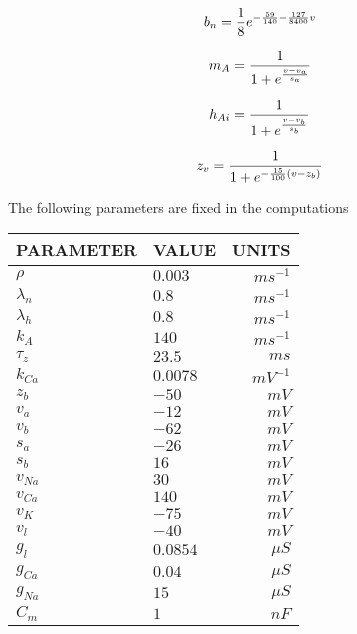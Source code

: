 \begin{equation}
b_n = \frac{1}{8} e^{-\frac{59}{140}-\frac{127}{8400}v}  \label{bn} \\
\end{equation}

\begin{equation}
m_A = \frac{1}{1+e^{\frac{v-v_a}{s_a}}}  \label{ma} \\
\end{equation}

\begin{equation}
h_{Ai} = \frac{1}{1+e^{\frac{v-v_b}{s_b}}}   \label{ha} \\
\end{equation}

\begin{equation}
z_v = \frac{1}{1+e^{-\frac{15}{100}(v - z_b)}} \label{zv} \\
\end{equation}

The following parameters are fixed in the computations

\begin{tabular}{||l|l|r||}               \hline  \hline
PARAMETER &   VALUE  &     UNITS  \\   \hline  \hline
$\rho$      &    $0.003$ &       $ms^{-1}$    \\ 
$\lambda_n$ &    $0.8$ &       $ms^{-1}$    \\
$\lambda_h$ &    $0.8$ &       $ms^{-1}$    \\
$k_{A}$     &    $140$ &       $ms^{-1}$    \\ \hline
$\tau_z$    &    $23.5$ &       $ms$    \\\hline
$k_{Ca}$     &    $0.0078$ &       $mV^{-1}$    \\  \hline
$z_b$       &    $-50$ &       $mV$   \\
$v_a$       &    $-12$ &       $mV$    \\
$v_b$       &    $-62$ &       $mV$    \\
$s_a$       &    $-26$ &       $mV$    \\
$s_b$       &    $16$ &       $mV$    \\   
$v_{Na}$    &    $30$ &       $mV$    \\
$v_{Ca}$    &    $140$ &       $mV$    \\
$v_K$       &    $-75$ &       $mV$    \\
$v_l$       &    $-40$ &       $mV$    \\      \hline
$g_l$       &    $0.0854$ &       $\mu S$    \\      
$g_{Ca}$       &    $0.04$ &       $\mu S$    \\      
$g_{Na}$       &    $15$ &       $\mu S$    \\      \hline
$C_m$       &    $1$ &       $nF$    \\      \hline  \hline
\end{tabular}

